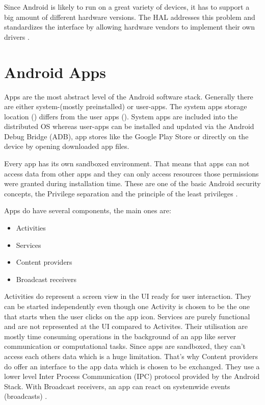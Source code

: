 Since Android is likely to run on a great variety of devices,
it has to support a big amount of different hardware versions.
The HAL addresses this problem and
standardizes the interface by allowing hardware vendors
to implement their own drivers \parencite{levin}.

\section{Android Apps}\label{section:android_apps}
Apps are the most abstract level of the Android software stack.
Generally there are either system-(mostly preinstalled) or user-apps.
The system apps storage location () differs from
the user apps (). System apps are included into the
distributed OS whereas user-apps can be installed and updated
via the Android Debug Bridge (ADB), app stores
like the Google Play Store or directly on the device by opening
downloaded app files.

Every app has its own sandboxed environment. That means that
apps can not access data from other apps and they can only access
resources those permissions were granted during installation time.
These are one of the basic Android security concepts,
the Privilege separation and the principle of the least
privileges \parencite{securityinternals}.

Apps do have several components, the main ones are:

\begin{itemize}
\item Activities
\item Services
\item Content providers
\item Broadcast receivers
\end{itemize}

Activities do represent a screen view in the UI ready for user
interaction. They can be started independently even though one Activity
is chosen to be the one that starts when the user clicks on the
app icon. Services are purely functional and are not represented
at the UI compared to Activites. Their utilisation are mostly time
consuming operations in the background of an app like server
communication or computational tasks. Since apps are sandboxed,
they can't access each others data which is a huge limitation.
That's why Content providers do offer an interface to the app
data which is chosen to be exchanged.
They use a lower level Inter Process Communication (IPC) protocol
provided by the Android Stack.
With Broadcast receivers, an app can react on systemwide events
(broadcasts) \parencite{securityinternals}.

